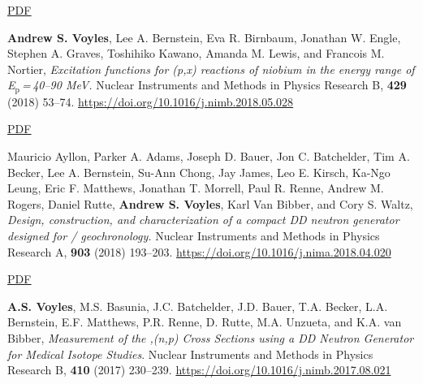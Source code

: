 \begin{bibsection}
\ifshort \vspace{0.1cm} \href{https://avoyles.github.io/papers/ASV_Dissertation.pdf}{\underline{PDF}} \else  \fi 


\item \textbf{Andrew S. Voyles}, Lee A. Bernstein, Eva R. Birnbaum, Jonathan W. Engle, Stephen A. Graves, Toshihiko Kawano, Amanda M. Lewis, and Francois M. Nortier, \emph{Excitation functions for (p,x) reactions of niobium in the energy range of  E$_{\text{p}}$\,=\,40--90 MeV.} Nuclear Instruments and Methods in Physics Research  B, 
\textbf{429} (2018) 53--74. \url{https://doi.org/10.1016/j.nimb.2018.05.028} 


  
\ifshort \vspace{0.1cm} \href{https://avoyles.github.io/papers/Voyles2018_Nb_px.pdf}{\underline{PDF}} \else  \fi 
    
    

\item Mauricio Ayllon, Parker A. Adams, Joseph D. Bauer, Jon C. Batchelder, Tim A. Becker, Lee A. Bernstein, Su-Ann Chong, Jay James, Leo E. Kirsch, Ka-Ngo Leung, Eric F. Matthews, Jonathan T. Morrell, Paul R. Renne, Andrew M. Rogers, Daniel Rutte, \textbf{Andrew S. Voyles}, Karl Van Bibber, and Cory S. Waltz, \emph{Design, construction, and characterization of a compact DD neutron generator designed for / geochronology.} Nuclear Instruments and Methods in Physics Research  A, 
\textbf{903} (2018) 193--203. \url{https://doi.org/10.1016/j.nima.2018.04.020} 

\ifshort \vspace{0.1cm} \href{https://avoyles.github.io/papers/Ayllon2018_geochronology.pdf}{\underline{PDF}} \else  \fi 


\item \textbf{A.S. Voyles}, M.S. Basunia, J.C. Batchelder, J.D. Bauer, T.A. Becker, L.A. Bernstein, E.F. Matthews, P.R. Renne, D. Rutte, M.A. Unzueta, and K.A. van Bibber, \emph{Measurement of the ,(n,p) Cross Sections using a DD Neutron Generator for Medical Isotope Studies}. Nuclear Instruments and Methods in Physics Research  B, \textbf{410} (2017) 230--239. \url{https://doi.org/10.1016/j.nimb.2017.08.021}


\end{bibsection}
